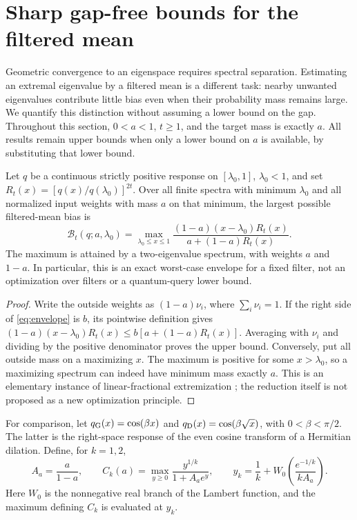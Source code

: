 \section{Sharp gap-free bounds for the filtered mean}\label{sec:gapfree}
Geometric convergence to an eigenspace requires spectral separation. Estimating
an extremal eigenvalue by a filtered mean is a different task: nearby unwanted
eigenvalues contribute little bias even when their probability mass remains
large. We quantify this distinction without assuming a lower bound on the gap.
Throughout this section, $0<a<1$, $t\geq1$, and the target mass is exactly $a$.
All results remain upper bounds when only a lower bound on $a$ is available,
by substituting that lower bound.

\begin{theorem}\label{thm:envelope}
Let $q$ be a continuous strictly positive response on $[\lambda_0,1]$,
$\lambda_0<1$, and set $R_t(x)=[q(x)/q(\lambda_0)]^{2t}$. Over all finite
spectra with minimum $\lambda_0$ and all normalized input weights with mass
$a$ on that minimum, the largest possible filtered-mean bias is
\begin{equation}\label{eq:envelope}
 \mathcal B_t(q;a,\lambda_0)
 =\max_{\lambda_0\leq x\leq1}
 \frac{(1-a)(x-\lambda_0)R_t(x)}{a+(1-a)R_t(x)}.
\end{equation}
The maximum is attained by a two-eigenvalue spectrum, with weights $a$ and
$1-a$. In particular, this is an exact worst-case envelope for a fixed filter,
not an optimization over filters or a quantum-query lower bound.
\end{theorem}
\begin{proof}
Write the outside weights as $(1-a)\nu_i$, where $\sum_i\nu_i=1$.
If the right side of \eqref{eq:envelope} is $b$, its pointwise definition gives
$(1-a)(x-\lambda_0)R_t(x)\leq b[a+(1-a)R_t(x)]$.
Averaging with $\nu_i$ and dividing by the positive denominator proves the
upper bound. Conversely, put all outside mass on a maximizing $x$.
The maximum is positive for some $x>\lambda_0$, so a maximizing spectrum can
indeed have minimum mass exactly $a$. This is an elementary instance of
linear-fractional extremization \cite{CharnesCooper}; the reduction itself is
not proposed as a new optimization principle.
\end{proof}

For comparison, let $q_{\rm G}(x)=\cos(\beta x)$ and
$q_{\rm D}(x)=\cos(\beta\sqrt{x})$, with $0<\beta<\pi/2$. The latter is the
right-space response of the even cosine transform of a Hermitian dilation.
Define, for $k=1,2$,
\begin{equation}\label{eq:constant}
 A_a=\frac{a}{1-a},\qquad
 C_k(a)=\max_{y\geq0}\frac{y^{1/k}}{1+A_a e^y},\qquad
 y_k=\frac1k+W_0\!\left(\frac{e^{-1/k}}{kA_a}\right).
\end{equation}
Here $W_0$ is the nonnegative real branch of the Lambert function, and the
maximum defining $C_k$ is evaluated at $y_k$.

